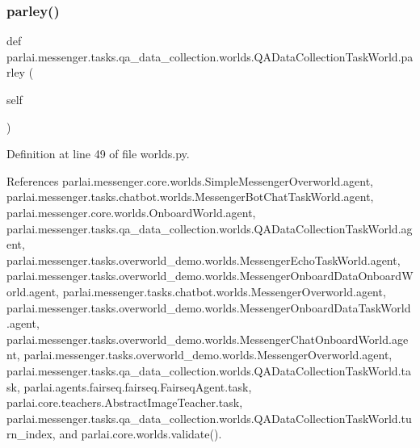 \subsubsection{\texorpdfstring{parley()}{parley()}}
{\footnotesize\ttfamily def parlai.\+messenger.\+tasks.\+qa\+\_\+data\+\_\+collection.\+worlds.\+Q\+A\+Data\+Collection\+Task\+World.\+parley (\begin{DoxyParamCaption}\item[{}]{self }\end{DoxyParamCaption})}



Definition at line 49 of file worlds.\+py.



References parlai.\+messenger.\+core.\+worlds.\+Simple\+Messenger\+Overworld.\+agent, parlai.\+messenger.\+tasks.\+chatbot.\+worlds.\+Messenger\+Bot\+Chat\+Task\+World.\+agent, parlai.\+messenger.\+core.\+worlds.\+Onboard\+World.\+agent, parlai.\+messenger.\+tasks.\+qa\+\_\+data\+\_\+collection.\+worlds.\+Q\+A\+Data\+Collection\+Task\+World.\+agent, parlai.\+messenger.\+tasks.\+overworld\+\_\+demo.\+worlds.\+Messenger\+Echo\+Task\+World.\+agent, parlai.\+messenger.\+tasks.\+overworld\+\_\+demo.\+worlds.\+Messenger\+Onboard\+Data\+Onboard\+World.\+agent, parlai.\+messenger.\+tasks.\+chatbot.\+worlds.\+Messenger\+Overworld.\+agent, parlai.\+messenger.\+tasks.\+overworld\+\_\+demo.\+worlds.\+Messenger\+Onboard\+Data\+Task\+World.\+agent, parlai.\+messenger.\+tasks.\+overworld\+\_\+demo.\+worlds.\+Messenger\+Chat\+Onboard\+World.\+agent, parlai.\+messenger.\+tasks.\+overworld\+\_\+demo.\+worlds.\+Messenger\+Overworld.\+agent, parlai.\+messenger.\+tasks.\+qa\+\_\+data\+\_\+collection.\+worlds.\+Q\+A\+Data\+Collection\+Task\+World.\+task, parlai.\+agents.\+fairseq.\+fairseq.\+Fairseq\+Agent.\+task, parlai.\+core.\+teachers.\+Abstract\+Image\+Teacher.\+task, parlai.\+messenger.\+tasks.\+qa\+\_\+data\+\_\+collection.\+worlds.\+Q\+A\+Data\+Collection\+Task\+World.\+turn\+\_\+index, and parlai.\+core.\+worlds.\+validate().

